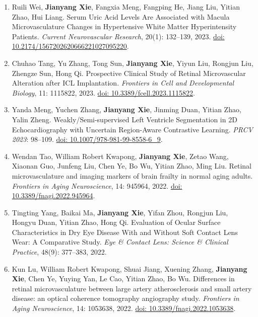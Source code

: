 \documentclass[11pt,a4paper]{article}
\begin{document}
\begin{enumerate}[label={\textcolor{accent}{\sffamily\footnotesize O\arabic*}},leftmargin=2.5em,itemsep=8pt,parsep=0pt]
\item Ruili Wei, \textbf{Jianyang Xie}, Fangxia Meng, Fangping He, Jiang Liu, Yitian Zhao, Hui Liang. Serum Uric Acid Levels Are Associated with Macula Microvasculature Changes in Hypertensive White Matter Hyperintensity Patients. \textit{Current Neurovascular Research}, 20(1): 132--139, 2023. \href{https://doi.org/10.2174/1567202620666221027095220}{doi: 10.2174/1567202620666221027095220}.
\item Chuhao Tang, Yu Zhang, Tong Sun, \textbf{Jianyang Xie}, Yiyun Liu, Rongjun Liu, Zhengze Sun, Hong Qi. Prospective Clinical Study of Retinal Microvascular Alteration after ICL Implantation. \textit{Frontiers in Cell and Developmental Biology}, 11: 1115822, 2023. \href{https://doi.org/10.3389/fcell.2023.1115822}{doi: 10.3389/fcell.2023.1115822}.
\item Yanda Meng, Yuchen Zhang, \textbf{Jianyang Xie}, Jinming Duan, Yitian Zhao, Yalin Zheng. Weakly/Semi-supervised Left Ventricle Segmentation in 2D Echocardiography with Uncertain Region-Aware Contrastive Learning. \textit{PRCV 2023}: 98--109. \href{https://doi.org/10.1007/978-981-99-8558-6_9}{doi: 10.1007/978-981-99-8558-6\_9}.
\item Wendan Tao, William Robert Kwapong, \textbf{Jianyang Xie}, Zetao Wang, Xiaonan Guo, Junfeng Liu, Chen Ye, Bo Wu, Yitian Zhao, Ming Liu. Retinal microvasculature and imaging markers of brain frailty in normal aging adults. \textit{Frontiers in Aging Neuroscience}, 14: 945964, 2022. \href{https://doi.org/10.3389/fnagi.2022.945964}{doi: 10.3389/fnagi.2022.945964}.
\item Tingting Yang, Baikai Ma, \textbf{Jianyang Xie}, Yifan Zhou, Rongjun Liu, Hongyu Duan, Yitian Zhao, Hong Qi. Evaluation of Ocular Surface Characteristics in Dry Eye Disease With and Without Soft Contact Lens Wear: A Comparative Study. \textit{Eye \& Contact Lens: Science \& Clinical Practice}, 48(9): 377--383, 2022.
\item Kun Lu, William Robert Kwapong, Shuai Jiang, Xuening Zhang, \textbf{Jianyang Xie}, Chen Ye, Yuying Yan, Le Cao, Yitian Zhao, Bo Wu. Differences in retinal microvasculature between large artery atherosclerosis and small artery disease: an optical coherence tomography angiography study. \textit{Frontiers in Aging Neuroscience}, 14: 1053638, 2022. \href{https://doi.org/10.3389/fnagi.2022.1053638}{doi: 10.3389/fnagi.2022.1053638}.

\end{enumerate}
\end{document}
